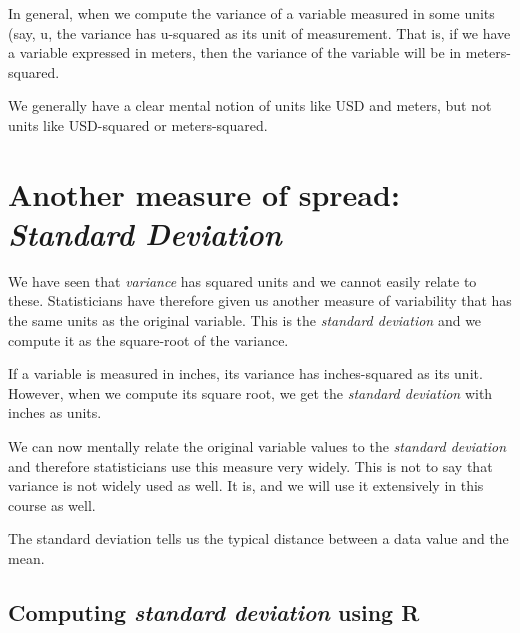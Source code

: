 \documentclass[
  12pt,
  letterpaper,
  DIV=11,
  numbers=noendperiod]{scrreprt}
\begin{document}
In general, when we compute the variance of a variable measured in some
units (say, u, the variance has u-squared as its unit of measurement.
That is, if we have a variable expressed in meters, then the variance of
the variable will be in meters-squared.

We generally have a clear mental notion of units like USD and meters,
but not units like USD-squared or meters-squared.

\section{\texorpdfstring{Another measure of spread: \emph{Standard
Deviation}}{Another measure of spread: Standard Deviation}}\label{another-measure-of-spread-standard-deviation}

We have seen that \emph{variance} has squared units and we cannot easily
relate to these. Statisticians have therefore given us another measure
of variability that has the same units as the original variable. This is
the \emph{standard deviation} and we compute it as the square-root of
the variance.

If a variable is measured in inches, its variance has inches-squared as
its unit. However, when we compute its square root, we get the
\emph{standard deviation} with inches as units.

We can now mentally relate the original variable values to the
\emph{standard deviation} and therefore statisticians use this measure
very widely. This is not to say that variance is not widely used as
well. It is, and we will use it extensively in this course as well.

\begin{tcolorbox}[enhanced jigsaw, colback=white, leftrule=.75mm, toprule=.15mm, bottomtitle=1mm, breakable, coltitle=black, toptitle=1mm, title=\textcolor{quarto-callout-important-color}{\faExclamation}\hspace{0.5em}{What information does the standard deviation give us}, opacitybacktitle=0.6, colbacktitle=quarto-callout-important-color!10!white, arc=.35mm, left=2mm, colframe=quarto-callout-important-color-frame, titlerule=0mm, rightrule=.15mm, bottomrule=.15mm, opacityback=0]

The standard deviation tells us the typical distance between a data
value and the mean.

\end{tcolorbox}

\subsection{\texorpdfstring{Computing \emph{standard deviation} using
R}{Computing standard deviation using R}}\label{computing-standard-deviation-using-r}
\end{document}
